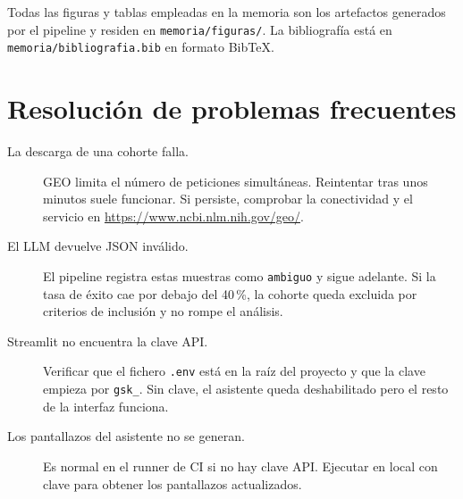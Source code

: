 Todas las figuras y tablas empleadas en la memoria son los artefactos
generados por el pipeline y residen en \texttt{memoria/figuras/}. La
bibliografía está en \texttt{memoria/bibliografia.bib} en formato
BibTeX.

\section*{Resolución de problemas frecuentes}
{}

\begin{description}
  \item[La descarga de una cohorte falla.] GEO limita el número de
  peticiones simultáneas. Reintentar tras unos minutos suele funcionar.
  Si persiste, comprobar la conectividad y el servicio en
  \url{https://www.ncbi.nlm.nih.gov/geo/}.
  \item[El LLM devuelve JSON inválido.] El pipeline registra estas
  muestras como \texttt{ambiguo} y sigue adelante. Si la tasa de éxito
  cae por debajo del 40\,\%, la cohorte queda excluida por criterios de
  inclusión y no rompe el análisis.
  \item[Streamlit no encuentra la clave API.] Verificar que el fichero
  \texttt{.env} está en la raíz del proyecto y que la clave empieza por
  \texttt{gsk\_}. Sin clave, el asistente queda deshabilitado pero el
  resto de la interfaz funciona.
  \item[Los pantallazos del asistente no se generan.] Es normal en el
  runner de CI si no hay clave API. Ejecutar en local con clave para
  obtener los pantallazos actualizados.
\end{description}
